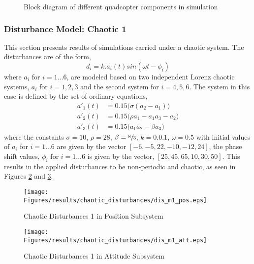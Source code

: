 \documentclass{article}
\begin{document}
\begin{figure}
	\begin{centering}{
		
		\caption{Block diagram of different quadcopter components in simulation }	
	}
	\end{centering}	
	\label{block_simulation}
\end{figure}

\subsubsection{Disturbance Model: Chaotic 1}
This section presents results of simulations carried under a chaotic system. The disturbances are of the form,
\begin{equation}
d_i = k.a_i(t)sin(\omega t-\phi_i)
\end{equation}
where $a_i$ for $i=1...6$, are modeled based on two independent Lorenz chaotic systems, $a_i$ for $i=1,2,3$ and the second system for $i=4,5,6$. The system in this case is defined by the set of ordinary equations, 
\begin{subequations}
\begin{align}
a'_1(t) &= 0.15\big(\sigma(a_2-a_1)\big)\\
a'_2(t) &= 0.15\big(\rho a_1 - a_1 a_3 - a_2\big)\\
a'_3(t) &= 0.15\big(a_1 a_2 - \beta a_3\big)
\end{align}
\end{subequations}
where the constants $\sigma=10$, $\rho=28$, $\beta=\sfrac{8}{3}$, $k=0.0.1$, $\omega=0.5$ with initial values of $a_i$ for $i=1...6$ are given by the vector $[-6,-5,22,-10,-12,24]$, the phase shift values, $\phi_i$ for $i=1...6$ is given by the vector, $[25,45,65,10,30,50]$. This results in the applied disturbances to be non-periodic and chaotic, as seen in Figures \ref{dis_m1_pos} and \ref{dis_m1_att}.

\begin{figure}[H]
\centering
\texttt{[image: Figures/results/chaotic\_disturbances/dis\_m1\_pos.eps]}
\caption{Chaotic Disturbances 1 in Position Subsystem}
\label{dis_m1_pos}
\end{figure}

\begin{figure}[H]
\centering
\texttt{[image: Figures/results/chaotic\_disturbances/dis\_m1\_att.eps]}
\caption{Chaotic Disturbances 1 in Attitude Subsystem}
\label{dis_m1_att}
\end{figure}
\end{document}
